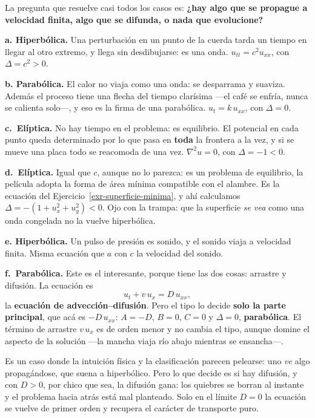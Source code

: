 \documentclass[
  spanish,
  a4paper,
]{scrbook}
\theoremstyle{definition}
\theoremstyle{plain}
\theoremstyle{definition}
\theoremstyle{plain}
\theoremstyle{definition}
\theoremstyle{remark}
\begin{document}
\begin{tcolorbox}[enhanced jigsaw, arc=.35mm, bottomrule=.15mm, bottomtitle=1mm, breakable, colback=white, colbacktitle=quarto-callout-tip-color!10!white, colframe=quarto-callout-tip-color-frame, coltitle=black, left=2mm, leftrule=.75mm, opacityback=0, opacitybacktitle=0.6, rightrule=.15mm, title=\textcolor{quarto-callout-tip-color}{\faLightbulb}\hspace{0.5em}{Solución}, titlerule=0mm, toprule=.15mm, toptitle=1mm]

La pregunta que resuelve casi todos los casos es: \textbf{¿hay algo que
se propague a velocidad finita, algo que se difunda, o nada que
evolucione?}

\textbf{a. Hiperbólica.} Una perturbación en un punto de la cuerda tarda
un tiempo en llegar al otro extremo, y llega sin desdibujarse: es una
onda. \(u_{tt} = c^2u_{xx}\), con \(\Delta = c^2 > 0\).

\textbf{b. Parabólica.} El calor no viaja como una onda: se desparrama y
suaviza. Además el proceso tiene una flecha del tiempo clarísima ---el
café se enfría, nunca se calienta solo---, y eso es la firma de una
parabólica. \(u_t = k\,u_{xx}\), con \(\Delta = 0\).

\textbf{c.~Elíptica.} No hay tiempo en el problema: es equilibrio. El
potencial en cada punto queda determinado por lo que pasa en
\textbf{toda} la frontera a la vez, y si se mueve una placa todo se
reacomoda de una vez. \(\nabla^2 u = 0\), con \(\Delta = -1 < 0\).

\textbf{d.~Elíptica.} Igual que \(c\), aunque no lo parezca: es un
problema de equilibrio, la película adopta la forma de área mínima
compatible con el alambre. Es la ecuación del
Ejercicio~\ref{exr-superficie-minima}, y ahí calculamos
\(\Delta = -(1+u_x^2+u_y^2) < 0\). Ojo con la trampa: que la superficie
\emph{se vea} como una onda congelada no la vuelve hiperbólica.

\textbf{e. Hiperbólica.} Un pulso de presión es sonido, y el sonido
viaja a velocidad finita. Misma ecuación que \(a\) con \(c\) la
velocidad del sonido.

\textbf{f.~Parabólica.} Este es el interesante, porque tiene las dos
cosas: arrastre y difusión. La ecuación es \[u_t + v\,u_x = D\,u_{xx},\]
la \textbf{ecuación de advección--difusión}. Pero el tipo lo decide
\textbf{solo la parte principal}, que acá es \(-D\,u_{xx}\): \(A = -D\),
\(B=0\), \(C=0\) y \(\Delta = 0\), \textbf{parabólica}. El término de
arrastre \(v\,u_x\) es de orden menor y no cambia el tipo, aunque domine
el aspecto de la solución ---la mancha viaja río abajo mientras se
ensancha---.

Es un caso donde la intuición física y la clasificación parecen
pelearse: uno \emph{ve} algo propagándose, que suena a hiperbólico. Pero
lo que decide es si hay difusión, y con \(D>0\), por chico que sea, la
difusión gana: los quiebres se borran al instante y el problema hacia
atrás está mal planteado. Solo en el límite \(D=0\) la ecuación se
vuelve de primer orden y recupera el carácter de transporte puro.

\end{tcolorbox}
\end{document}
